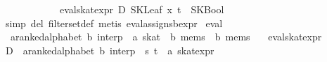 \begin{isabellebody}
\ \ \ \ \ \ \ \ \ \ \ \ eval{}skat{}expr\ D\ {}SKLeaf\ x\ t\ {}{}{}\ SKBool\ {}{}\ {}{}\isanewline
\ \ \ \ \isamarkupfalse%
\ {}simp\ del{}\ filter{}set{}def{}\ metis\ eval{}assigns{}{}bexpr{}\isanewline
{}\isamarkupfalse%
%
\endisatagproof
{\isafoldproof}%
%
\isadelimproof
\isanewline
%
\endisadelimproof
\isanewline
{}\isamarkupfalse%
\ eval\ {}{}\isanewline
\ \ {}{}{}a{}{}ranked{}alphabet{}\ {}b{}\ interp\ {}\ {}a\ skat\ {}\ {}b\ mems\ {}\ {}b\ mems{}\isanewline
\ \ \ eval{}skat{}expr\isanewline
%
\isadelimproof
%
\endisadelimproof
%
\isatagproof
{}\isamarkupfalse%
\ {}\isanewline
\ \ \isamarkupfalse%
\ D\ {}{}\ {}{}{}a{}{}ranked{}alphabet{}\ {}b{}\ interp{}\ \ s\ t\ {}{}\ {}{}a\ skat{}expr{}\isanewline

\end{isabellebody}
